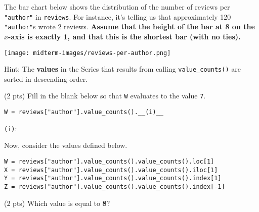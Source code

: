 \documentclass[twoside,12pt]{article}
\begin{document}
\begin{probset}
\begin{prob}[(8 pts)]
\end{prob}

\newpage

\begin{prob}[(8 pts)]

The bar chart below shows the distribution of the number of reviews per \texttt{"author"} in \texttt{reviews}. For instance, it's telling us that approximately 120 \texttt{"author"}s wrote 2 reviews. \textbf{Assume that the height of the bar at 8 on the $x$-axis is exactly 1, and that this is the shortest bar (with no ties).}
\vspace{-0.1in}
\begin{center}
\texttt{[image: midterm-images/reviews-per-author.png]}
\end{center}
\vspace{-0.2in}

Hint: The \textbf{values} in the Series that results from calling \texttt{value\_counts()} are sorted in descending order.

\begin{subprobset}

\begin{subprob}(2 pts) Fill in the blank below so that \texttt{W} evaluates to the value \texttt{7}.

\begin{verbatim}
W = reviews["author"].value_counts().__(i)__
\end{verbatim}

\texttt{(i)}: \hspace{0.01in} \inlineresponsebox[4in]{}
    
\end{subprob}
    
\end{subprobset}

Now, consider the values defined below. \vspace{-0.1in}

\begin{verbatim}
W = reviews["author"].value_counts().value_counts().loc[1]
X = reviews["author"].value_counts().value_counts().iloc[1]
Y = reviews["author"].value_counts().value_counts().index[1]
Z = reviews["author"].value_counts().value_counts().index[-1]
\end{verbatim}

\begin{subprobset}

\begin{subprob}(2 pts) Which value is equal to \textbf{8}?


\end{subprob}
\end{subprobset}
\end{prob}
\end{probset}
\end{document}
